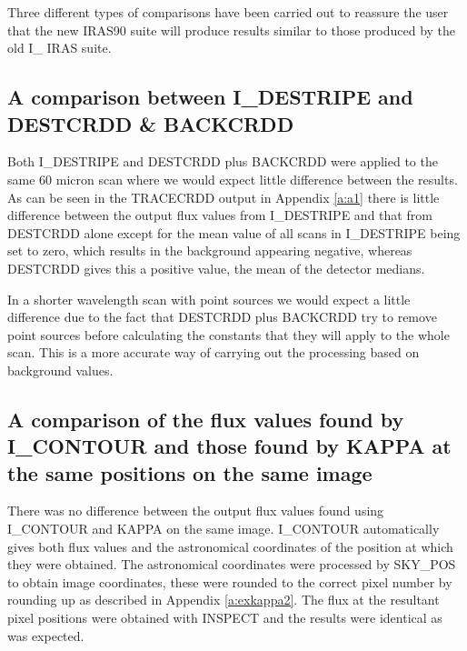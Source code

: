\documentclass[twoside,11pt]{article}
\begin{document}
Three different types of comparisons have been carried out to reassure the user
that the new IRAS90 suite will produce results similar to those produced by
the old  I\_ IRAS suite. 

\subsection{A comparison between I\_DESTRIPE and DESTCRDD \& BACKCRDD}

Both I\_DESTRIPE and DESTCRDD plus BACKCRDD were applied to the same 60 micron
scan where we would expect little difference between the results. As can be 
seen in the TRACECRDD output in Appendix \ref{a:a1} there is little difference
between the output flux values from I\_DESTRIPE and that from DESTCRDD alone
except for the mean value of all scans in I\_DESTRIPE being set to zero, which
results in the background appearing negative, whereas DESTCRDD gives this a 
positive value, the mean of the detector medians. 

In a shorter wavelength scan with point sources we would expect a little
difference due to the fact that DESTCRDD plus BACKCRDD try to remove point
sources before calculating the  constants that they will apply to the whole 
scan. This is a  more accurate  way of carrying out the processing based on
background values.
\subsection{A comparison of the flux values found by I\_CONTOUR and those found
by KAPPA at the same positions on the same image}
There was no difference between the output flux values found using I\_CONTOUR
and KAPPA on the same image. I\_CONTOUR automatically gives both flux values
and the astronomical coordinates of the position at which they were obtained.
The astronomical coordinates were processed by SKY\_POS to obtain image
coordinates, these were rounded to the correct pixel number by rounding up as
described in Appendix \ref{a:exkappa2}. The flux at the resultant pixel
positions were obtained with INSPECT and the results were identical as was
expected.
\end{document}
